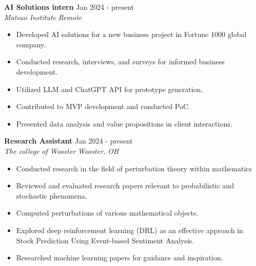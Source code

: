 \documentclass[a4paper,12pt]{article}
\begin{document}
\textbf{\large AI Solutions intern} \hfill \textnormal{Jan 2024 - present}\\
\textit{Matsuo Institute} \hfill \textit{Remote}
\begin{itemize}
    \item Developed AI solutions for a new business project in Fortune 1000 global company.
    \item Conducted research, interviews, and surveys for informed business development.
    \item Utilized LLM and ChatGPT API for prototype generation.
    \item Contributed to MVP development and conducted PoC.
    \item Presented data analysis and value propositions in client interactions.
\end{itemize}
\textbf{\large Research Assistant} \hfill \textnormal{Jan 2024 - present}\\
\textit{The college of Wooster} \hfill \textit{Wooster, OH}
\begin{itemize}
    \item Conducted research in the field of perturbation theory within mathematics
    \item Reviewed and evaluated research papers relevant to probabilistic and stochastic phenomena.
    \item Computed perturbations of various mathematical objects.
    \item Explored deep reinforcement learning (DRL) as an effective approach in Stock Prediction Using Event-based Sentiment Analysis.
    \item Researched machine learning papers for guidance and inspiration.
\end{itemize}
\end{document}
